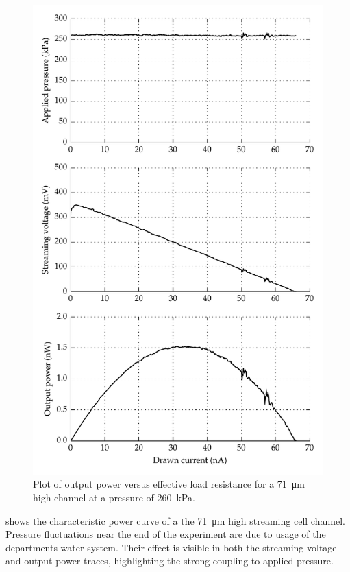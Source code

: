     \begin{figure}
        \centering
        \includegraphics{content/pt1/01-PowerHarvesting/graphics/graph_streamingCell_outputPower_resistanceSweep}
        \caption{\label{fig:streamingCell_maxPower}Plot of output power versus effective load resistance for a \SI{71}{\micro\metre} high channel at a pressure of \SI{260}{\kilo\pascal}.}
    \end{figure}

     shows the characteristic power curve of a the \SI{71}{\micro\meter} high streaming cell channel.
    Pressure fluctuations near the end of the experiment are due to usage of the departments water system.
    Their effect is visible in both the streaming voltage and output power traces, highlighting the strong coupling to applied pressure.

